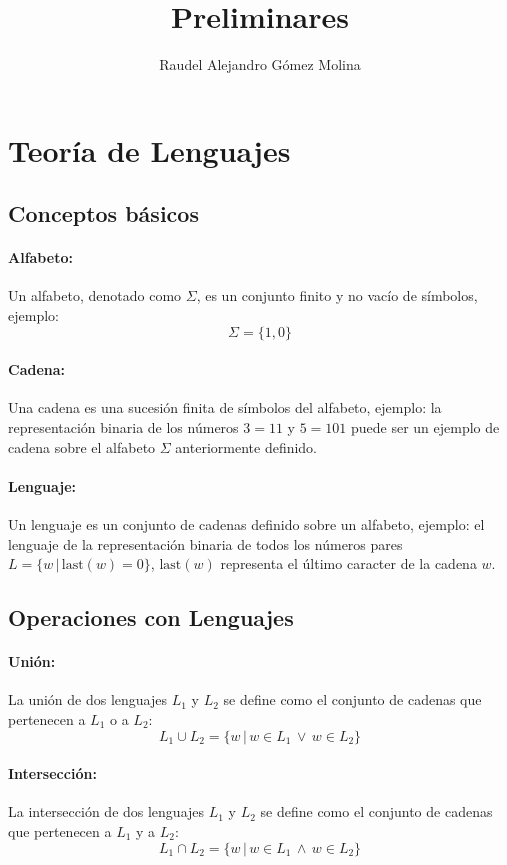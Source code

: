 \documentclass{article}
\title{Preliminares}
\author{Raudel Alejandro Gómez Molina}
\begin{document}
\maketitle

\section{Teoría de Lenguajes}

\subsection{Conceptos básicos}

\paragraph{Alfabeto:} Un alfabeto, denotado como $\Sigma$, es un conjunto finito y no vacío de símbolos, ejemplo:
$$\Sigma=\{1,0\}$$
\paragraph{Cadena:} Una cadena es una sucesión finita de símbolos del alfabeto, ejemplo: la representación binaria de
los números $3=11$ y $5=101$ puede ser un ejemplo de cadena sobre el alfabeto $\Sigma$ anteriormente
definido.
\paragraph{Lenguaje:} Un lenguaje es un conjunto de cadenas definido sobre un alfabeto, ejemplo: el lenguaje de la
representación binaria de todos los números pares $L=\{w\,|\,\text{last}(w)=0\}$, $\text{last}(w)$
representa el último caracter de la cadena $w$.

\subsection{Operaciones con Lenguajes}

\paragraph{Unión:} La unión de dos lenguajes $L_1$ y $L_2$ se define como el conjunto de cadenas que
pertenecen a $L_1$ o a $L_2$:
$$L_1\cup L_2=\{w\,|\,w\in L_1\,\vee\,w\in L_2\}$$
\paragraph{Intersección:} La intersección de dos lenguajes $L_1$ y $L_2$ se define como el conjunto de
cadenas que pertenecen a $L_1$ y a $L_2$:
$$L_1\cap L_2=\{w\,|\,w\in L_1\,\wedge\,w\in L_2\}$$
\end{document}
